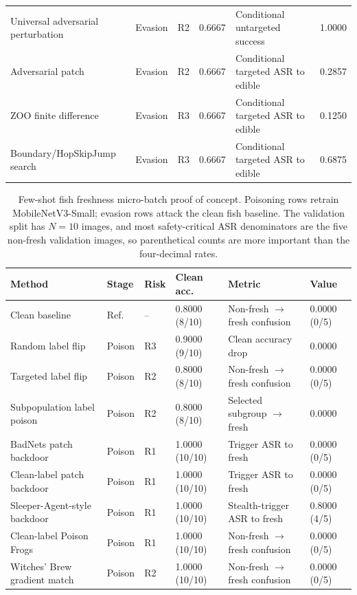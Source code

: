 ﻿\documentclass[6p,10pt,times]{ieeeaccess}
\begin{document}
\begin{table}[t]
\begin{tabular}{p{}p{}p{}p{}p{}p{}}
Universal adversarial perturbation & Evasion & R2 & 0.6667 & Conditional untargeted success & 1.0000 \\
Adversarial patch & Evasion & R2 & 0.6667 & Conditional targeted ASR to edible & 0.2857 \\
ZOO finite difference & Evasion & R3 & 0.6667 & Conditional targeted ASR to edible & 0.1250 \\
Boundary/HopSkipJump search & Evasion & R3 & 0.6667 & Conditional targeted ASR to edible & 0.6875 \\
\bottomrule
\end{tabular}
\end{table}

\begin{table}[t]
\centering
\caption{Few-shot fish freshness micro-batch proof of concept. Poisoning rows retrain MobileNetV3-Small; evasion rows attack the clean fish baseline. The validation split has \(N=10\) images, and most safety-critical ASR denominators are the five non-fresh validation images, so parenthetical counts are more important than the four-decimal rates.}
\label{tab:fishresults}
\small
\begin{tabular}{p{}p{}p{}p{}p{}p{}}
\toprule
Method & Stage & Risk & Clean acc. & Metric & Value \\
\midrule
Clean baseline & Ref. & -- & 0.8000 (8/10) & Non-fresh \(\rightarrow\) fresh confusion & 0.0000 (0/5) \\
Random label flip & Poison & R3 & 0.9000 (9/10) & Clean accuracy drop & 0.0000 \\
Targeted label flip & Poison & R2 & 0.8000 (8/10) & Non-fresh \(\rightarrow\) fresh confusion & 0.0000 (0/5) \\
Subpopulation label poison & Poison & R2 & 0.8000 (8/10) & Selected subgroup \(\rightarrow\) fresh & 0.0000 \\
BadNets patch backdoor & Poison & R1 & 1.0000 (10/10) & Trigger ASR to fresh & 0.0000 (0/5) \\
Clean-label patch backdoor & Poison & R1 & 1.0000 (10/10) & Trigger ASR to fresh & 0.0000 (0/5) \\
Sleeper-Agent-style backdoor & Poison & R1 & 1.0000 (10/10) & Stealth-trigger ASR to fresh & 0.8000 (4/5) \\
Clean-label Poison Frogs & Poison & R1 & 1.0000 (10/10) & Non-fresh \(\rightarrow\) fresh confusion & 0.0000 (0/5) \\
Witches' Brew gradient match & Poison & R2 & 1.0000 (10/10) & Non-fresh \(\rightarrow\) fresh confusion & 0.0000 (0/5) \\

\end{tabular}
\end{table}
\end{document}
